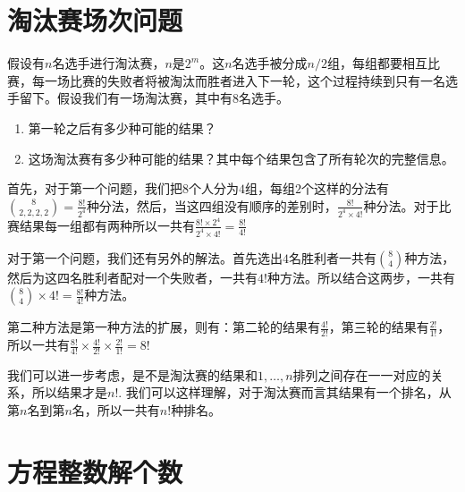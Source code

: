 \documentclass[10pt,a4paper,UTF8]{article}
\begin{document}
\section{淘汰赛场次问题}
\label{sec:orge7d69fe}


\begin{instance}
假设有\(n\)名选手进行淘汰赛，\(n\)是\(2^{m}\)。这\(n\)名选手被分成\(n/2\)组，每组都要相互比赛，每一场比赛的失败者将被淘汰而胜者进入下一轮，这个过程持续到只有一名选手留下。假设我们有一场淘汰赛，其中有\(8\)名选手。
\begin{enumerate}
\item 第一轮之后有多少种可能的结果？
\item 这场淘汰赛有多少种可能的结果？其中每个结果包含了所有轮次的完整信息。
\end{enumerate}
\end{instance}

\begin{answer}
首先，对于第一个问题，我们把\(8\)个人分为\(4\)组，每组\(2\)个这样的分法有\(\binom{8}{2,2,2,2}= \frac{8!}{2^{4}}\)种分法，然后，当这四组没有顺序的差别时，\(\frac{8!}{2^{4}\times 4!}\)种分法。对于比赛结果每一组都有两种所以一共有\(\frac{8!\times 2^{4}}{2^{4} \times 4!} = \frac{8!}{4!}\)

对于第一个问题，我们还有另外的解法。首先选出\(4\)名胜利者一共有\(\binom{8}{4}\)种方法，然后为这四名胜利者配对一个失败者，一共有\(4!\)种方法。所以结合这两步，一共有\(\binom{8}{4}\times 4! =\frac{8!}{4!}\)种方法。

第二种方法是第一种方法的扩展，则有：第二轮的结果有\(\frac{4!}{2!}\)，第三轮的结果有\(\frac{2!}{1!}\)，所以一共有\(\frac{8!}{4!}\times \frac{4!}{2!} \times \frac{2!}{1!} = 8!\)

我们可以进一步考虑，是不是淘汰赛的结果和\(1,\ldots ,n\)排列之间存在一一对应的关系，所以结果才是\(n!\). 我们可以这样理解，对于淘汰赛而言其结果有一个排名，从第\(n\)名到第\(n\)名，所以一共有\(n!\)种排名。
\end{answer}
\section{方程整数解个数}
\label{sec:orgc81dcf2}
\end{document}
